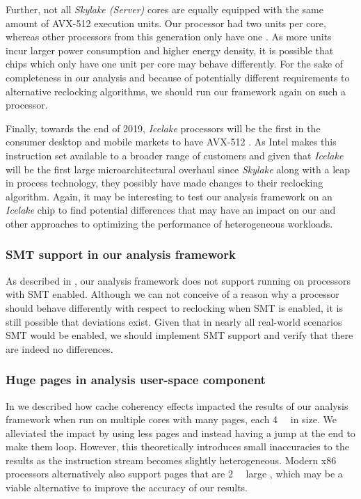 Further, not all \textit{Skylake (Server)} cores are equally equipped with the same amount of \gls{AVX-512} execution units. Our processor had two units per core, whereas other processors from this generation only have one \cite{intelxeonscalabledeepdive}. As more units incur larger power consumption and higher energy density, it is possible that chips which only have one unit per core may behave differently. For the sake of completeness in our analysis and because of potentially different requirements to alternative reclocking algorithms, we should run our framework again on such a processor.

Finally, towards the end of 2019, \textit{Icelake} processors will be the first in the consumer desktop and mobile markets to have \gls{AVX-512} \cite{thicelake}. As Intel makes this instruction set available to a broader range of customers and given that \textit{Icelake} will be the first large microarchitectural overhaul since \textit{Skylake} along with a leap in process technology, they possibly have made changes to their reclocking algorithm. Again, it may be interesting to test our analysis framework on an \textit{Icelake} chip to find potential differences that may have an impact on our and other approaches to optimizing the performance of heterogeneous workloads.

\subsubsection{SMT support in our analysis framework}
\label{sec:conclusion:futurework:smt}

As described in , our analysis framework does not support running on processors with \gls{SMT} enabled. Although we can not conceive of a reason why a processor should behave differently with respect to reclocking when \gls{SMT} is enabled, it is still possible that deviations exist. Given that in nearly all real-world scenarios \gls{SMT} would be enabled, we should implement \gls{SMT} support and verify that there are indeed no differences.

\subsubsection{Huge pages in analysis user-space component}
\label{sec:conclusion:futurework:hugepages}

In  we described how cache coherency effects impacted the results of our analysis framework when run on multiple cores with many pages, each \SI{4}{\kibi\byte} in size. We alleviated the impact by using less pages and instead having a jump at the end to make them loop. However, this theoretically introduces small inaccuracies to the results as the instruction stream becomes slightly heterogeneous. Modern x86 processors alternatively also support pages that are \SI{2}{\mebi\byte} large \cite{intelsdmsysprogguide}, which may be a viable alternative to improve the accuracy of our results.

